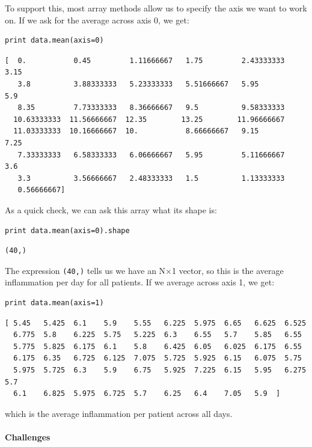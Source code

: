 \documentclass[]{book}
\begin{document}
To support this, most array methods allow us to specify the axis we want
to work on. If we ask for the average across axis 0, we get:

\begin{verbatim}
print data.mean(axis=0)
\end{verbatim}

\begin{verbatim}
[  0.           0.45         1.11666667   1.75         2.43333333   3.15
   3.8          3.88333333   5.23333333   5.51666667   5.95         5.9
   8.35         7.73333333   8.36666667   9.5          9.58333333
  10.63333333  11.56666667  12.35        13.25        11.96666667
  11.03333333  10.16666667  10.           8.66666667   9.15         7.25
   7.33333333   6.58333333   6.06666667   5.95         5.11666667   3.6
   3.3          3.56666667   2.48333333   1.5          1.13333333
   0.56666667]
\end{verbatim}

As a quick check, we can ask this array what its shape is:

\begin{verbatim}
print data.mean(axis=0).shape
\end{verbatim}

\begin{verbatim}
(40,)
\end{verbatim}

The expression \texttt{(40,)} tells us we have an N×1 vector, so this is
the average inflammation per day for all patients. If we average across
axis 1, we get:

\begin{verbatim}
print data.mean(axis=1)
\end{verbatim}

\begin{verbatim}
[ 5.45   5.425  6.1    5.9    5.55   6.225  5.975  6.65   6.625  6.525
  6.775  5.8    6.225  5.75   5.225  6.3    6.55   5.7    5.85   6.55
  5.775  5.825  6.175  6.1    5.8    6.425  6.05   6.025  6.175  6.55
  6.175  6.35   6.725  6.125  7.075  5.725  5.925  6.15   6.075  5.75
  5.975  5.725  6.3    5.9    6.75   5.925  7.225  6.15   5.95   6.275  5.7
  6.1    6.825  5.975  6.725  5.7    6.25   6.4    7.05   5.9  ]
\end{verbatim}

which is the average inflammation per patient across all days.

\mbox{}\paragraph{Challenges}
\end{document}
